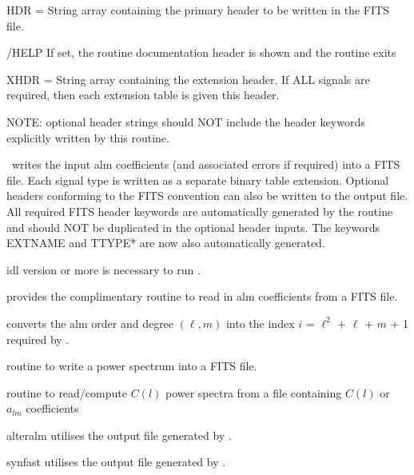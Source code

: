 \begin{keywords}
  \begin{kwlist}{} %
    \item[HDR =] String array containing the primary header to be written in the FITS
      file. 
    \item[/HELP] If set, the routine documentation header is shown and the routine exits	
    \item[XHDR =] String array containing the extension header. If
                  ALL signals are required, then each extension table
                  is given this header.
    \item[ ] NOTE: optional header strings should NOT include the
             header keywords explicitly written by this routine.
  \end{kwlist}
\end{keywords}  

\begin{codedescription}
{\thedocid\ writes the input alm coefficients (and associated errors if 
required) into a FITS file. Each signal type is written as a separate
binary table extension. Optional headers conforming
to the FITS convention can also be written to the output file. All
required FITS header keywords are automatically generated by the
routine and should NOT be duplicated in the optional header inputs.
The keywords EXTNAME and TTYPE* are now also automatically generated.
}
\end{codedescription}



\begin{related}
  \begin{sulist}{} %
    \item[idl] version \idlversion or more is necessary to run \thedocid.
    \item[\htmlref{fits2alm}{idl:fits2alm}] provides the complimentary routine to read in 
      alm coefficients from a FITS file.
    \item[\htmlref{lm2index}{idl:lm2index}] converts the alm order and degree
    $(\ell, m)$ into the index $i$ = $\ell^2$ + $\ell$ + $m$ + 1 required by
\thedocid.
    \item[\htmlref{cl2fits}{idl:cl2fits}] routine to write a power spectrum into
a FITS file.
    \item[\htmlref{fits2cl}{idl:fits2cl}] routine to read/compute $C(l)$ power spectra from a file containing $C(l)$ or $a_{lm}$ coefficients
    \item[alteralm] utilises the output file generated by \thedocid.
    \item[synfast] utilises the output file generated by \thedocid.
  \end{sulist}
\end{related}

